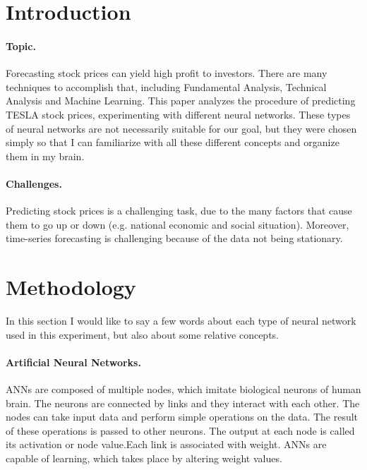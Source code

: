 \documentclass{article}
\begin{document}

\printAffiliationsAndNotice{}


\section{Introduction}

\paragraph*{Topic.}
Forecasting stock prices can yield high profit to investors. There are many techniques to accomplish that, including Fundamental Analysis, Technical Analysis and Machine Learning. This paper analyzes the procedure of predicting TESLA stock prices, experimenting with different neural networks. These types of neural networks are not necessarily suitable for our goal, but they were chosen simply so that I can familiarize with all these different concepts and organize them in my brain.
\paragraph*{Challenges.}
Predicting stock prices is a challenging task, due to the many factors that cause them to go up or down (e.g. national economic and social situation). Moreover, time-series forecasting is challenging because of the data not being stationary.

\section{Methodology}
In this section I would like to say a few words about each type of neural network used in this experiment, but also about some relative concepts.
\paragraph*{Artificial Neural Networks.}
ANNs are composed of multiple nodes, which imitate biological neurons of human brain. The neurons are connected by links and they interact with each other. The nodes can take input data and perform simple operations on the data. The result of these operations is passed to other neurons. The output at each node is called its activation or node value.Each link is associated with weight. ANNs are capable of learning, which takes place by altering weight values.
\end{document}
